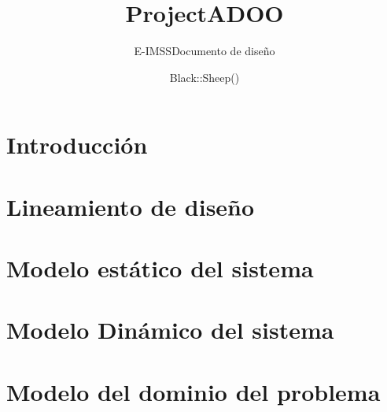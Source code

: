 \documentclass[oneside,10pt]{book}
\title{ProjectADOO}
\subtitle{E-IMSS}
\subtitle{Documento de diseño}
\author{Black::Sheep()}
\begin{document}
\maketitle
\thispagestyle{empty}


\tableofcontents



\chapter{Introducción}


\chapter{Lineamiento de diseño}


\chapter{Modelo estático del sistema}




\chapter{Modelo Dinámico del sistema}




\chapter{Modelo del dominio del problema}



	
\end{document}
